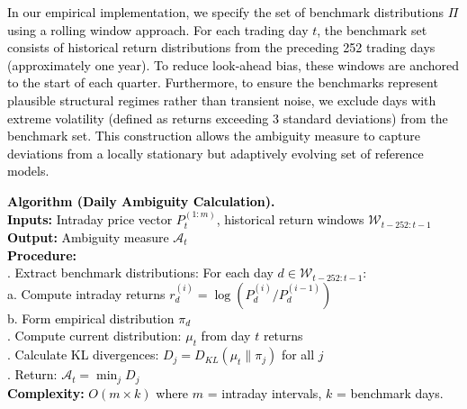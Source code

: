 \documentclass[preprint,12pt,authoryear]{elsarticle}
\begin{document}
\textcolor{black}{In our empirical implementation, we specify the set of benchmark distributions $\Pi$ using a rolling window approach. For each trading day $t$, the benchmark set consists of historical return distributions from the preceding 252 trading days (approximately one year). To reduce look-ahead bias, these windows are anchored to the start of each quarter. Furthermore, to ensure the benchmarks represent plausible structural regimes rather than transient noise, we exclude days with extreme volatility (defined as returns exceeding 3 standard deviations) from the benchmark set. This construction allows the ambiguity measure to capture deviations from a locally stationary but adaptively evolving set of reference models.}

\vspace{\baselineskip}
\noindent
\textcolor{black}{
\textbf{Algorithm (Daily Ambiguity Calculation).}\\
\textbf{Inputs:} Intraday price vector $P_{t}^{(1:m)}$, historical return windows $\mathcal{W}_{t-252:t-1}$\\
\textbf{Output:} Ambiguity measure $\mathcal{A}_t$\\
\textbf{Procedure:}\\
. Extract benchmark distributions: For each day $d \in \mathcal{W}_{t-252:t-1}$:\\
\indent\indent a. Compute intraday returns $r^{(i)}_d = \log(P^{(i)}_d/P^{(i-1)}_d)$\\
\indent\indent b. Form empirical distribution $\pi_d$\\
. Compute current distribution: $\mu_t$ from day $t$ returns\\
. Calculate KL divergences: $D_j = D_{KL}(\mu_t \| \pi_j)$ for all $j$\\
. Return: $\mathcal{A}_t = \min_j D_j$\\
\textbf{Complexity:} $O(m \times k)$ where $m$ = intraday intervals, $k$ = benchmark days.
}
\end{document}
